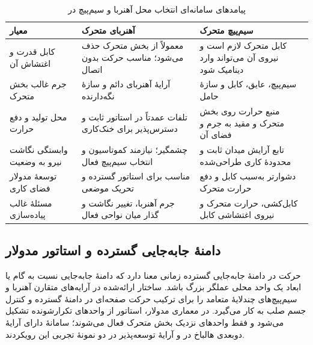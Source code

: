 \begin{table}[htbp]
	\centering
	\caption{پیامدهای سامانه‌ای انتخاب محل آهنربا و سیم‌پیچ در }
	\label{tab:architecture-consequences}
	\renewcommand{\arraystretch}{1.3}
	\small
	\begin{tabular}{|p{}|p{}|p{}|}
		\hline
		\textbf{معیار} & \textbf{آهنربای متحرک} & \textbf{سیم‌پیچ متحرک} \\
		\hline
		کابل قدرت و اغتشاش آن & معمولاً از بخش متحرک حذف می‌شود؛ مناسب حرکت بدون اتصال & کابل متحرک لازم است و نیروی آن می‌تواند وارد دینامیک شود \cite{nakataDriveStabilizationMultidegreeoffreedom2025} \\
		\hline
		جرم غالب بخش متحرک & آرایهٔ آهنربای دائم و سازهٔ نگه‌دارنده & سیم‌پیچ، عایق، کابل و سازهٔ حامل \\
		\hline
		محل تولید و دفع حرارت & تلفات عمدتاً در استاتور ثابت و دسترس‌پذیر برای خنک‌کاری & منبع حرارت روی بخش متحرک و مقید به جرم و فضای آن \\
		\hline
		وابستگی نگاشت نیرو به وضعیت & چشمگیر؛ نیازمند کموتاسیون و انتخاب سیم‌پیچ فعال \cite{hu6DOFExtendedUnified2024} & تابع آرایش میدان ثابت و محدودهٔ کاری طراحی‌شده \\
		\hline
		توسعهٔ مدولار فضای کاری & مناسب برای استاتور گسترده و تحریک موضعی \cite{xuModularMaglevDesign2024d} & دشوارتر به‌سبب کابل و دفع حرارت متحرک \\
		\hline
		مسئلهٔ غالب پیاده‌سازی & جرم آهنربا، تغییر نگاشت و گذار میان نواحی فعال & کابل‌کشی، حرارت متحرک و نیروی اغتشاشی کابل \\
		\hline
	\end{tabular}
\end{table}

\subsection{دامنهٔ جابه‌جایی گسترده و استاتور مدولار}
\label{subsec:long_stroke_modular}

حرکت در دامنهٔ جابه‌جایی گسترده زمانی معنا دارد که دامنهٔ جابه‌جایی نسبت به گام یا ابعاد یک واحد محلی عملگر بزرگ باشد. ساختار ارائه‌شده در \cite{lu6DDirectdriveTechnology2012} آرایه‌های متقارن آهنربا و سیم‌پیچ‌های چندلایهٔ متعامد را برای ترکیب حرکت صفحه‌ای در دامنهٔ گسترده و کنترل جسم صلب به کار می‌گیرد. در معماری مدولار، استاتور از واحدهای تکرارشونده تشکیل می‌شود و فقط واحدهای نزدیک بخش متحرک فعال می‌شوند؛ سامانهٔ دارای آرایهٔ دوبعدی هالباخ در \cite{xuModularMaglevDesign2024d} و آرایهٔ توسعه‌پذیر در \cite{miyasakaMagneticLevitationUnlimited2014} دو نمونهٔ تجربی این رویکردند.

